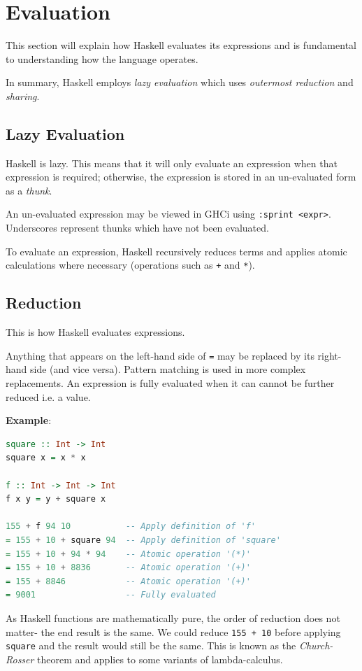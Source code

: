 \section{Evaluation}

This section will explain how Haskell evaluates its expressions and is fundamental to understanding how the language operates.

In summary, Haskell employs \textit{lazy evaluation} which uses \textit{outermost reduction} and \textit{sharing}.

\subsection{Lazy Evaluation}
Haskell is lazy. This means that it will only evaluate an expression when that expression is required; otherwise, the expression is stored in an un-evaluated form as a \textit{thunk}.

An un-evaluated expression may be viewed in GHCi using \texttt{:sprint <expr>}. Underscores represent thunks which have not been evaluated.

To evaluate an expression, Haskell recursively reduces terms and applies atomic calculations where necessary (operations such as \texttt{+} and \texttt{*}).

\subsection{Reduction}
This is how Haskell evaluates expressions.

Anything that appears on the left-hand side of \texttt{=} may be replaced by its right-hand side (and vice versa). Pattern matching is used in more complex replacements. An expression is fully evaluated when it can cannot be further reduced i.e. a value.

\textbf{Example}:
\begin{lstlisting}[language=haskell]
square :: Int -> Int
square x = x * x

f :: Int -> Int -> Int
f x y = y + square x

155 + f 94 10           -- Apply definition of 'f'
= 155 + 10 + square 94  -- Apply definition of 'square'
= 155 + 10 + 94 * 94    -- Atomic operation '(*)'
= 155 + 10 + 8836       -- Atomic operation '(+)'
= 155 + 8846            -- Atomic operation '(+)'
= 9001                  -- Fully evaluated
\end{lstlisting}

As Haskell functions are mathematically pure, the order of reduction does not matter- the end result is the same. We could reduce \texttt{155 + 10} before applying \texttt{square} and the result would still be the same.
This is known as the \textit{Church-Rosser} theorem and applies to some variants of lambda-calculus.

